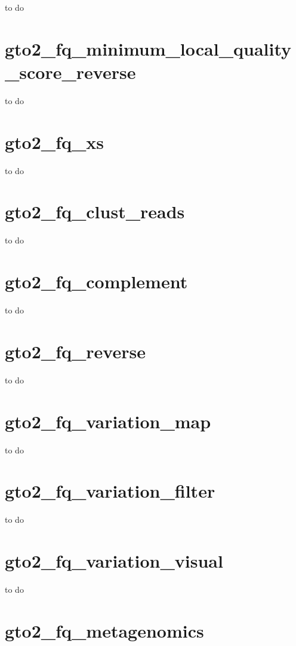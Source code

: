 \documentclass[11pt,]{krantz}
\begin{document}
to do

\section{gto2\_fq\_minimum\_local\_quality\_score\_reverse}\label{gto2_fq_minimum_local_quality_score_reverse}

to do

\section{gto2\_fq\_xs}\label{gto2_fq_xs}

to do

\section{gto2\_fq\_clust\_reads}\label{gto2_fq_clust_reads}

to do

\section{gto2\_fq\_complement}\label{gto2_fq_complement}

to do

\section{gto2\_fq\_reverse}\label{gto2_fq_reverse}

to do

\section{gto2\_fq\_variation\_map}\label{gto2_fq_variation_map}

to do

\section{gto2\_fq\_variation\_filter}\label{gto2_fq_variation_filter}

to do

\section{gto2\_fq\_variation\_visual}\label{gto2_fq_variation_visual}

to do

\section{gto2\_fq\_metagenomics}\label{gto2_fq_metagenomics}
\end{document}
